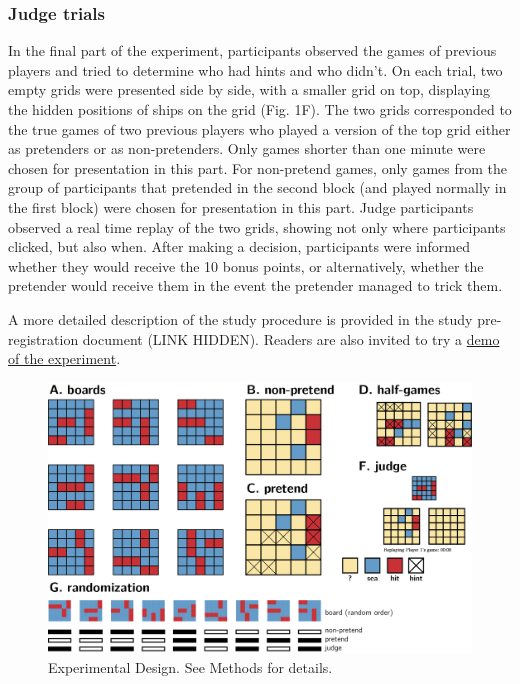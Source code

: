 \documentclass[10pt, letterpaper]{article}
\newenvironment{CodeChunk}{}{}
\begin{document}
\hypertarget{judge-trials}{%
\subsubsection{Judge trials}\label{judge-trials}}

In the final part of the experiment, participants observed the games of
previous players and tried to determine who had hints and who didn't. On
each trial, two empty grids were presented side by side, with a smaller
grid on top, displaying the hidden positions of ships on the grid (Fig.
1F). The two grids corresponded to the true games of two previous
players who played a version of the top grid either as pretenders or as
non-pretenders. Only games shorter than one minute were chosen for
presentation in this part. For non-pretend games, only games from the
group of participants that pretended in the second block (and played
normally in the first block) were chosen for presentation in this part.
Judge participants observed a real time replay of the two grids, showing
not only where participants clicked, but also when. After making a
decision, participants were informed whether they would receive the 10
bonus points, or alternatively, whether the pretender would receive them
in the event the pretender managed to trick them.

A more detailed description of the study procedure is provided in the
study pre-registration document (LINK HIDDEN). Readers are also invited
to try a \href{https://jatos.mindprobe.eu/publix/NervzpM0Y0z}{demo of
the experiment}.

\begin{CodeChunk}
\begin{figure}[tb]
\includegraphics[width=1\linewidth]{../figures/Battleships_design} \caption[Experimental Design]{Experimental Design. See Methods for details.}\label{fig:design}
\end{figure}
\end{CodeChunk}
\end{document}
